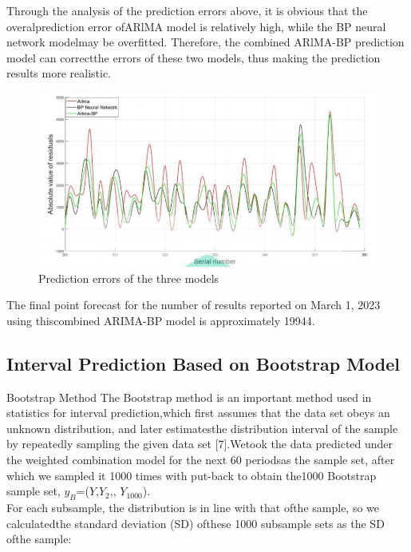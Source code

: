 \documentclass[12pt]{ctexart}
\begin{document}
\newpage
Through the analysis of the prediction errors above, it is obvious that the overalprediction error ofARlMA model is relatively high, while the BP neural network modelmay be overfitted. Therefore, the combined ARlMA-BP prediction model can correctthe errors of these two models, thus making the prediction results more realistic.
\begin{figure}[htbp]
	\centering
	\includegraphics[width=\textwidth]{1706020552100.png}
	\caption{Prediction errors of the three models}
	\label{fg:8}
\end{figure}
The final point forecast for the number of results reported on March 1, 2023 using thiscombined ARIMA-BP model is approximately 19944.

\subsection{Interval Prediction Based on Bootstrap Model}
Bootstrap Method
The Bootstrap method is an important method used in statistics for interval prediction,which first assumes that the data set obeys an unknown distribution, and later estimatesthe distribution interval of the sample by repeatedly sampling the given data set [7].Wetook the data predicted under the weighted combination model for the next 60 periodsas the sample set, after which we sampled it 1000 times with put-back to obtain the1000 Bootstrap sample set, $y_B$=($Y$,$Y_2$,\textbullet\textbullet\textbullet\textbullet\textbullet\textbullet, $Y_1000$).
\\
For each subsample, the distribution is in line with that ofthe sample, so we calculatedthe standard deviation (SD) ofthese 1000 subsample sets as the SD ofthe sample:
\end{document}
